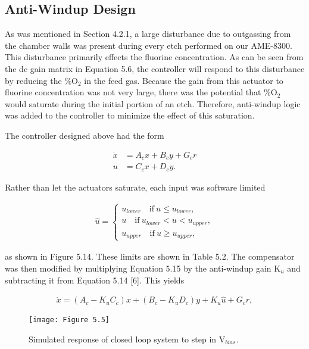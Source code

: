 \subsection{Anti-Windup Design}

\tab As was mentioned in Section 4.2.1, a large disturbance due to outgassing from the
chamber walls was present during every etch performed on our AME-8300. This disturbance
primarily effects the fluorine concentration. As can be seen from the dc gain matrix in
Equation 5.6, the controller will respond to this disturbance by reducing the \%$\text{O}_{2}$ in the
feed gas. Because the gain from this actuator to fluorine concentration was not very large,
there was the potential that \%$\text{O}_{2}$ would saturate during the initial portion of an etch.
Therefore, anti-windup logic was added to the controller to minimize the effect of this
saturation.

The controller designed above had the form

\begin{align}
	\dot{x} &= A_{c}x + B_{c}y + G_{c}r \\
	u &= C_{c}x + D_{c}y.
\end{align}

Rather than let the actuators saturate, each input was software limited

\begin{align}
	\hat{u} = \begin{cases}
		u_{lower} \quad \text{if} \ u \leq u_{lower}, \\
		u \quad \text{if} \ u_{lower} < u < u_{upper}, \\
		u_{upper} \quad \text{if} \ u \geq u_{upper},
	\end{cases}
\end{align}

\noindent as shown in Figure 5.14. These limits are shown in Table 5.2. The compensator was then
modified by multiplying Equation 5.15 by the anti-windup gain $\text{K}_{u}$ and subtracting it from
Equation 5.14 [6]. This yields


\begin{align}
	\dot{x} = (A_{c}-K_{u}C_{c})x + (B_{c}-K_{u}D_{c})y + K_{u}\hat{u} + G_{c}r,
\end{align}

\begin{figure}[H]
	\centering
	\texttt{[image: Figure 5.5]}
	\bf\caption{  Simulated response of closed loop system to step in $\text{V}_{bias}$.}
	\label{fig:5.5}
\end{figure}

